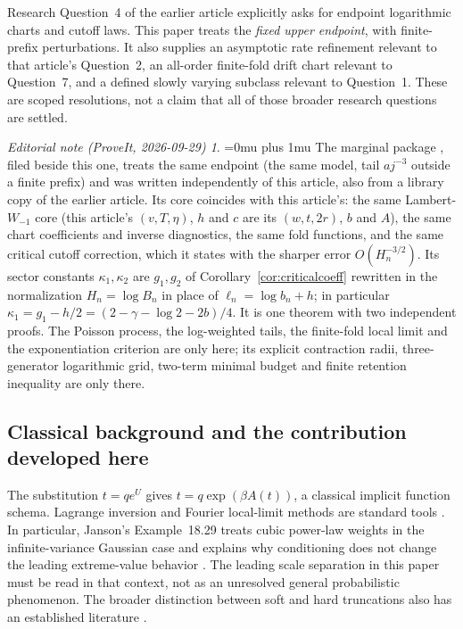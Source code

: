\documentclass[11pt,a4paper]{article}
\numberwithin{equation}{section}
\theoremstyle{definition}
\theoremstyle{remark}
\newtheorem*{ednoteinner}{Editorial note (ProveIt, 2026-09-29)}
\newenvironment{ednote}{\begin{ednoteinner}\sloppy\Urlmuskip=0mu plus 1mu\relax}{\end{ednoteinner}}
\begin{document}
Research Question~4 of the earlier article explicitly asks for endpoint
logarithmic charts and cutoff laws. This paper treats the \emph{fixed upper
endpoint}, with finite-prefix perturbations. It also supplies an asymptotic
rate refinement relevant to that article's Question~2, an all-order
finite-fold drift chart relevant to Question~7, and a defined slowly varying
subclass relevant to Question~1. These are scoped resolutions, not a claim
that all of those broader research questions are settled.
\begin{ednote}
The marginal package \cite{ed:mct}, filed beside this one, treats the same
endpoint (the same model, tail $a j^{-3}$ outside a finite prefix) and was
written independently of this article, also from a library copy of the
earlier article. Its core coincides with this article's: the same
Lambert-$W_{-1}$ core (this article's $(v,T,\eta)$, $h$ and $c$ are its
$(w,t,2r)$, $b$ and $A$), the same chart coefficients and
inverse diagnostics, the same fold functions, and the same critical cutoff
correction, which it states with the sharper error $O(H_n^{-3/2})$. Its
sector constants $\kappa_1,\kappa_2$ are $g_1,g_2$ of
Corollary~\ref{cor:criticalcoeff} rewritten in the normalization
$H_n=\log B_n$ in place of $\ell_n=\log b_n+h$; in particular
$\kappa_1=g_1-h/2=(2-\gamma-\log2-2b)/4$. It is one theorem with two
independent proofs. The Poisson process, the log-weighted tails, the
finite-fold local limit and the exponentiation criterion are only here; its
explicit contraction radii, three-generator logarithmic grid, two-term
minimal budget and finite retention inequality are only there.
\end{ednote}

\subsection{Classical background and the contribution developed here}
The substitution $t=qe^U$ gives $t=q\exp(\beta A(t))$, a classical implicit
function schema. Lagrange inversion and Fourier local-limit methods are
standard tools \cite{flajolet,janson}. In particular, Janson's
Example~18.29 treats cubic power-law weights in the infinite-variance
Gaussian case and explains why conditioning does not change the leading
extreme-value behavior \cite{janson}. The leading scale separation in this
paper must be read in that context, not as an unresolved general
probabilistic phenomenon. The broader distinction between soft and hard
truncations also has an established literature \cite{chakrabarty}.
\end{document}
